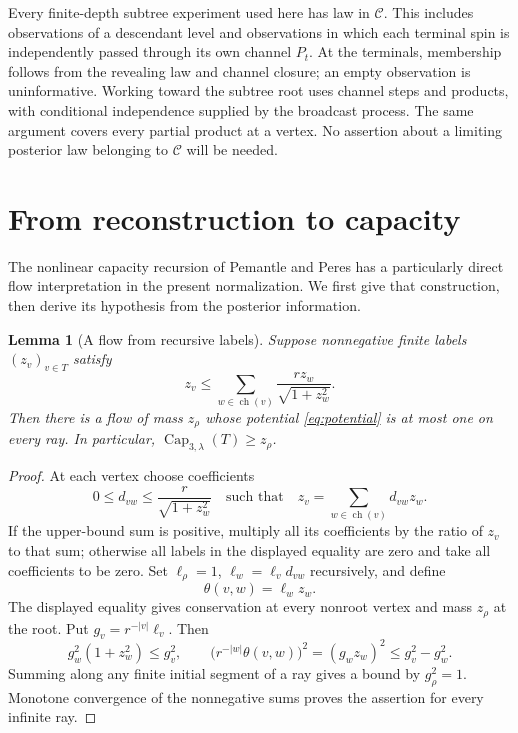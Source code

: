 \documentclass[11pt]{article}
\newtheorem{lemma}[theorem]{Lemma}
\numberwithin{equation}{section}
\newcommand{\calC}{\mathcal C}
\newcommand{\Capacity}{\operatorname{Cap}}
\newcommand{\children}{\operatorname{ch}}
\begin{document}
Every finite-depth subtree experiment used here has law in
$\calC$. This includes observations of a descendant level and
observations in which each terminal spin is independently passed
through its own channel $P_t$. At the terminals, membership follows
from the revealing law and channel closure; an empty observation
is uninformative. Working toward the subtree root uses channel
steps and products, with conditional independence supplied by the
broadcast process. The same argument covers every partial product
at a vertex. No assertion about a limiting posterior law belonging
to $\calC$ will be needed.

\section{From reconstruction to capacity}
\label{sec:necessity}

The nonlinear capacity recursion of Pemantle and Peres
\cite[Lemma~3.1 and Corollary~3.4]{PP10} has a particularly direct
flow interpretation in the present normalization. We first give
that construction, then derive its hypothesis from the posterior
information.

\begin{lemma}[A flow from recursive labels]\label{lem:flow}
Suppose nonnegative finite labels $(z_v)_{v\in T}$ satisfy
\begin{equation}\label{eq:label-recursion}
 z_v\leq\sum_{w\in\children(v)}
                  \frac{r z_w}{\sqrt{1+z_w^2}}.
\end{equation}
Then there is a flow of mass $z_\rho$ whose potential
\eqref{eq:potential} is at most one on every ray. In particular,
$\Capacity_{3,\lambda}(T)\geq z_\rho$.
\end{lemma}
\begin{proof}
At each vertex choose coefficients
\[
 0\leq d_{vw}\leq\frac{r}{\sqrt{1+z_w^2}}
 \quad\text{such that}\quad
 z_v=\sum_{w\in\children(v)}d_{vw}z_w.
\]
If the upper-bound sum is positive, multiply all its coefficients
by the ratio of $z_v$ to that sum; otherwise all labels in the
displayed equality are zero and take all coefficients to be zero.
Set $\ell_\rho=1$, $\ell_w=\ell_vd_{vw}$ recursively, and define
\[
 \theta(v,w)=\ell_wz_w.
\]
The displayed equality gives conservation at every nonroot vertex
and mass $z_\rho$ at the root. Put $g_v=r^{-|v|}\ell_v$. Then
\[
 g_w^2(1+z_w^2)\leq g_v^2,
 \qquad
 \bigl(r^{-|w|}\theta(v,w)\bigr)^2
       =(g_wz_w)^2\leq g_v^2-g_w^2.
\]
Summing along any finite initial segment of a ray gives a bound
by $g_\rho^2=1$. Monotone convergence of the nonnegative sums
proves the assertion for every infinite ray.
\end{proof}
\end{document}
